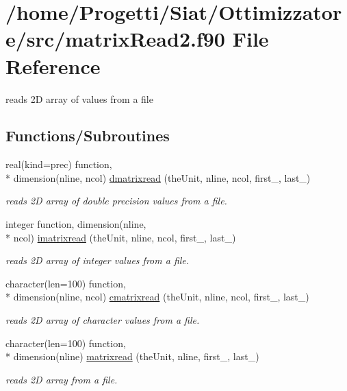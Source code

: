 \hypertarget{matrix_read2_8f90}{\section{/home/\-Progetti/\-Siat/\-Ottimizzatore/src/matrix\-Read2.f90 File Reference}
\label{matrix_read2_8f90}
}


reads 2\-D array of values from a file  


\subsection*{Functions/\-Subroutines}
\begin{DoxyCompactItemize}
\item 
real(kind=prec) function, \\*
dimension(nline, ncol) \hyperlink{matrix_read2_8f90_ae4323e4e0e0e6ecb1e6bc40ccb4bec64}{dmatrixread} (the\-Unit, nline, ncol, first\-\_\-, last\-\_\-)
\begin{DoxyCompactList}\small\item\em reads 2\-D array of double precision values from a file. \end{DoxyCompactList}\item 
integer function, dimension(nline, \\*
ncol) \hyperlink{matrix_read2_8f90_a9bbb90a3f70ad54afe3a0c51af1396d7}{imatrixread} (the\-Unit, nline, ncol, first\-\_\-, last\-\_\-)
\begin{DoxyCompactList}\small\item\em reads 2\-D array of integer values from a file. \end{DoxyCompactList}\item 
character(len=100) function, \\*
dimension(nline, ncol) \hyperlink{matrix_read2_8f90_abf64de424b7c068365381697e8ec0207}{cmatrixread} (the\-Unit, nline, ncol, first\-\_\-, last\-\_\-)
\begin{DoxyCompactList}\small\item\em reads 2\-D array of character values from a file. \end{DoxyCompactList}\item 
character(len=100) function, \\*
dimension(nline) \hyperlink{matrix_read2_8f90_ab6e07303536c022a24a5c1d0caffc9e4}{matrixread} (the\-Unit, nline, first\-\_\-, last\-\_\-)
\begin{DoxyCompactList}\small\item\em reads 2\-D array from a file. \end{DoxyCompactList}\end{DoxyCompactItemize}


